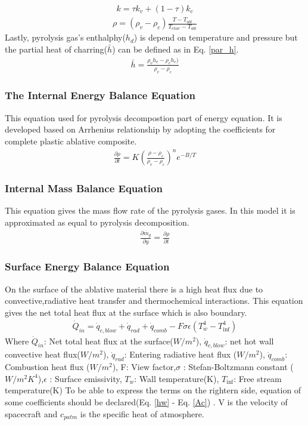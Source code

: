 \documentclass[a4paper, 12pt]{article} %
\begin{document}
\begin{eqnarray} \label{k}
k=\tau k_v+(1-\tau)k_c
\end{eqnarray}
\begin{eqnarray} \label{rho}
\rho=(\rho _v - \rho _c)\frac{T-T_{abl}}{T_{char}-T_{abl}}
\end{eqnarray}
\newline
Lastly, pyrolysis gas's enthalphy($h_d$) is depend on temperature and pressure but the partial heat of charring($\bar{h}$) can be defined  as in Eq. \ref{par_h}.
\begin{eqnarray} \label{par_h}
\bar{h}=\frac{\rho _vh_v - \rho _ch_c)}{\rho _v-\rho _c}
\end{eqnarray}


\subsubsection{The Internal Energy Balance Equation}
This equation used for pyrolysis decompostion part of energy equation. It is developed based on Arrhenius relationship by adopting the coefficients for complete plastic ablative composite.
\begin{eqnarray} \label{Arr}
 \frac{\partial \rho}{\partial t}=K(\frac{\rho - \rho _c}{\rho _v-\rho _c})^ne^{-B/T}
\end{eqnarray}

\subsubsection{Internal Mass Balance Equation }
This equation gives the mass flow rate of the pyrolysis gases. In this model it is approximated as equal to pyrolysis decomposition.
\begin{eqnarray} \label{m_g}
\frac{\partial \dot{m_g}}{\partial y} =\frac{\partial \rho}{\partial t}
\end{eqnarray}
\subsubsection{Surface Energy Balance Equation }
On the surface of the ablative material there is a high heat flux  due to convective,radiative heat transfer and thermochemical interactions. This equation gives the net total heat flux at the surface which is also boundary.
 \begin{eqnarray} \label{Arr}
\dot{Q}_{in}=\dot{q}_{c,blow}+\dot{q}_{rad}+\dot{q}_{comb}-F\sigma \epsilon (T_w^4-T_{\inf}^4)
\end{eqnarray}
Where $\dot{Q}_{in}$: Net total heat flux at the surface($W/m^2$), $\dot{q}_{c,blow}$: net hot wall convective heat flux($W/m^2$), $\dot{q}_{rad}$: Entering radiative heat flux ($W/m^2$), $\dot{q}_{comb}$: Combustion heat flux ($W/m^2$), F: View factor,$ \sigma$ : Stefan-Boltzmann constant ($W/m^2K^4$),$ \epsilon$ : Surface emissivity, $T_w$: Wall temperature(K), $T_{\inf}$: Free stream temperature(K) \newline
To be able to express the terms on the rightern side, equation of some coefficients should be declared(Eq. \ref{hw} - Eq. \ref{Ac}) . V is the velocity of spacecraft and $c_{patm}$ is the specific heat of atmosphere.
\end{document}

